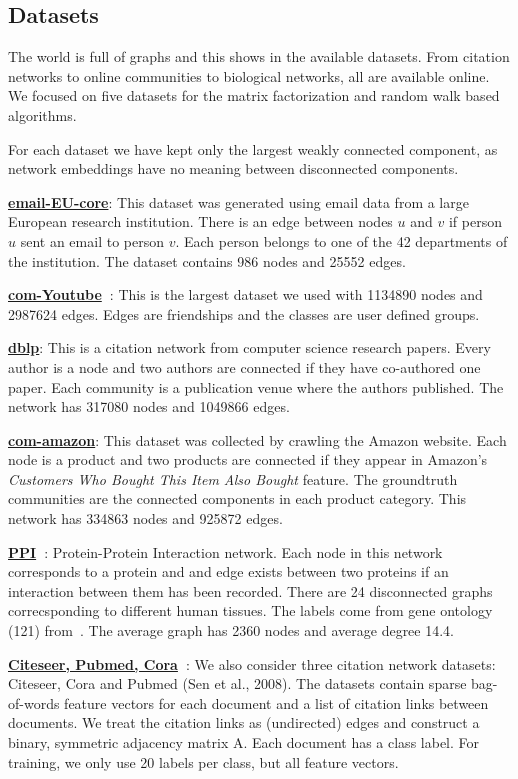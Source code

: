 \subsection{Datasets}

The world is full of graphs and this shows in the available datasets. From citation networks to
online communities to biological networks, all are available online.  We focused on five datasets
for the matrix factorization and random walk based algorithms.

For each dataset we have kept only the largest weakly connected component, as network embeddings
have no meaning between disconnected components.

{\bf \href{https://snap.stanford.edu/data/email-Eu-core.html}{email-EU-core}}: This dataset was
generated using email data from a large European research institution. There is an edge between
nodes $u$ and $v$ if person $u$ sent an email to person $v$.  Each person belongs to one of the 42
departments of the institution. The dataset contains 986 nodes and 25552 edges.

{\bf \href{https://snap.stanford.edu/data/com-Youtube.html}{com-Youtube}~\cite{mislove-2007-socialnetworks}}:
This is the largest dataset we used with 1134890 nodes and 2987624 edges. Edges are friendships and
the classes are user defined groups.

{\bf \href{https://snap.stanford.edu/data/com-DBLP.html}{dblp}}: This is a citation network from
computer science research papers. Every author is a node and two authors are connected if they have
co-authored one paper. Each community is a publication venue where the authors published. The
network has 317080 nodes and 1049866 edges.

{\bf \href{https://snap.stanford.edu/data/com-Amazon.html}{com-amazon}}: This dataset was collected
by crawling the Amazon website. Each node is a product and two products are connected if they appear
in Amazon's {\it Customers Who Bought This Item Also Bought} feature. The groundtruth communities
are the connected components in each product category.  This network has 334863 nodes and 925872
edges.

{\bf \href{http://snap.stanford.edu/graphsage/}{PPI}~\cite{hamilton2017inductive}}: Protein-Protein
Interaction network. Each node in this network corresponds to a protein and and edge exists between
two proteins if an interaction between them has been recorded. There are 24 disconnected graphs
correcsponding to different human tissues.  The labels come from gene ontology (121)
from~\cite{subramanian2005gene}. The average graph has 2360 nodes and average degree 14.4.

{\bf \href{https://github.com/tkipf/gcn/tree/master/gcn/data}{Citeseer, Pubmed, Cora}~\cite{kipf2016semi}}: We also consider three citation network datasets: Citeseer, Cora and Pubmed (Sen et al., 2008). The datasets contain sparse bag-of-words feature vectors for each document and a list of citation links between documents. We treat the citation links as (undirected) edges and construct a binary, symmetric adjacency matrix A. Each document has a class label. For training, we only use 20 labels per class, but all feature vectors.
